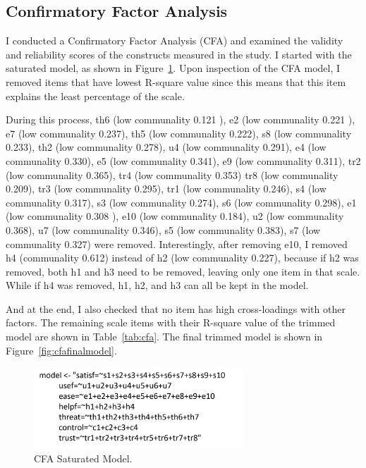 \subsection{Confirmatory Factor Analysis}
I conducted a Confirmatory Factor Analysis (CFA) and examined the validity and reliability scores of the constructs measured in the study. I started with the saturated model, as shown in Figure~\ref{fig:cfasaturated}. Upon inspection of the CFA model, I removed items that have lowest R-square value since this means that this item explains the least percentage of the scale. 

During this process, th6 (low communality 0.121 ), e2 (low communality 0.221 ), e7 (low communality 0.237), th5 (low communality 0.222), s8 (low communality 0.233), th2 (low communality 0.278), u4 (low communality 0.291), e4 (low communality 0.330), e5 (low communality 0.341), e9 (low communality 0.311), tr2 (low communality 0.365), tr4 (low communality 0.353)
tr8 (low communality 0.209), tr3 (low communality 0.295), tr1 (low communality 0.246), s4 (low communality 0.317), s3 (low communality 0.274), s6 (low communality 0.298), e1 (low communality 0.308 ), e10 (low communality 0.184), u2 (low communality 0.368), u7 (low communality 0.346), s5 (low communality 0.383), s7 (low communality 0.327) were removed. Interestingly, after removing e10, I removed h4 (communality 0.612) instead of h2 (low communality 0.227), because if h2 was removed, both h1 and h3 need to be removed, leaving only one item in that scale. While if h4 was removed, h1, h2, and h3 can all be kept in the model.

And at the end, I also checked that no item has high cross-loadings with other factors. The remaining scale items with their R-square value of the trimmed model are shown in Table~\ref{tab:cfa}. The final trimmed model is shown in Figure~\ref{fig:cfafinalmodel}.

\begin{figure}
	\centering
	\includegraphics[width=0.7\textwidth]{figures/cfasaturated.png}
	\caption{CFA Saturated Model.}
	\label{fig:cfasaturated}
\end{figure}

